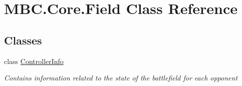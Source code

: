 \hypertarget{class_m_b_c_1_1_core_1_1_field}{\section{M\-B\-C.\-Core.\-Field Class Reference}
\label{class_m_b_c_1_1_core_1_1_field}
}
\subsection*{Classes}
\begin{DoxyCompactItemize}
\item 
class \hyperlink{class_m_b_c_1_1_core_1_1_field_1_1_controller_info}{Controller\-Info}
\begin{DoxyCompactList}\small\item\em Contains information related to the state of the battlefield for each opponent\end{DoxyCompactList}\end{DoxyCompactItemize}
